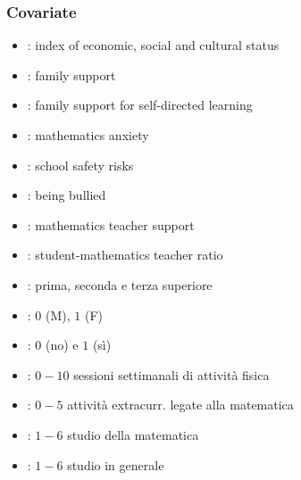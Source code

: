 \documentclass{beamer}
\begin{document}
\begin{frame}
    \frametitle{Covariate}
    \begin{itemize}
    \item{ : index of economic, social and cultural status}
    \item{ : family support}
    \item{ : family support for self-directed learning}
    \item{ : mathematics anxiety}
    \item{ : school safety risks}
    \item{ : being bullied}
    \item{ : mathematics teacher support}
    \item{ : student-mathematics teacher ratio}
    \end{itemize}
\end{frame}

\begin{frame}
    \begin{itemize}
    \item{ : prima, seconda e terza superiore}
    \item{ : $0$ (M), $1$ (F)}
    \item{ : $0$ (no) e $1$ (sì)}
    \item{ : $0-10$ sessioni settimanali di attività fisica}
    \item{ : $0-5$ attività extracurr. legate alla matematica}
    \item{ : $1-6$ studio della matematica}
    \item{ : $1-6$ studio in generale}
    \end{itemize}
\end{frame}

\end{document}
